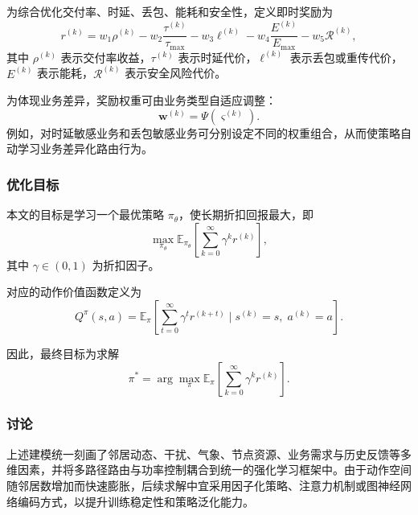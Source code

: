 为综合优化交付率、时延、丢包、能耗和安全性，定义即时奖励为
\begin{equation}
r^{(k)}=
w_1\rho^{(k)}
-w_2\frac{\tau^{(k)}}{\tau_{\max}}
-w_3\ell^{(k)}
-w_4\frac{E^{(k)}}{E_{\max}}
-w_5\mathcal{R}^{(k)},
\end{equation}
其中 $\rho^{(k)}$ 表示交付率收益，$\tau^{(k)}$ 表示时延代价，$\ell^{(k)}$ 表示丢包或重传代价，$E^{(k)}$ 表示能耗，$\mathcal{R}^{(k)}$ 表示安全风险代价。

为体现业务差异，奖励权重可由业务类型自适应调整：
\begin{equation}
\mathbf{w}^{(k)}=\Psi(\varsigma^{(k)}).
\end{equation}
例如，对时延敏感业务和丢包敏感业务可分别设定不同的权重组合，从而使策略自动学习业务差异化路由行为。

\subsubsection{优化目标}

本文的目标是学习一个最优策略 $\pi_\theta$，使长期折扣回报最大，即
\begin{equation}
\max_{\pi_\theta}
\mathbb{E}_{\pi_\theta}
\left[
\sum_{k=0}^{\infty}\gamma^k r^{(k)}
\right],
\end{equation}
其中 $\gamma\in(0,1)$ 为折扣因子。

对应的动作价值函数定义为
\begin{equation}
Q^\pi(s,a)=
\mathbb{E}_{\pi}
\left[
\sum_{t=0}^{\infty}\gamma^t r^{(k+t)}
\mid s^{(k)}=s,\;a^{(k)}=a
\right].
\end{equation}

因此，最终目标为求解
\begin{equation}
\pi^*=\arg\max_{\pi}
\mathbb{E}_{\pi}
\left[
\sum_{k=0}^{\infty}\gamma^k r^{(k)}
\right].
\end{equation}

\subsubsection{讨论}

上述建模统一刻画了邻居动态、干扰、气象、节点资源、业务需求与历史反馈等多维因素，并将多路径路由与功率控制耦合到统一的强化学习框架中。由于动作空间随邻居数增加而快速膨胀，后续求解中宜采用因子化策略、注意力机制或图神经网络编码方式，以提升训练稳定性和策略泛化能力。
